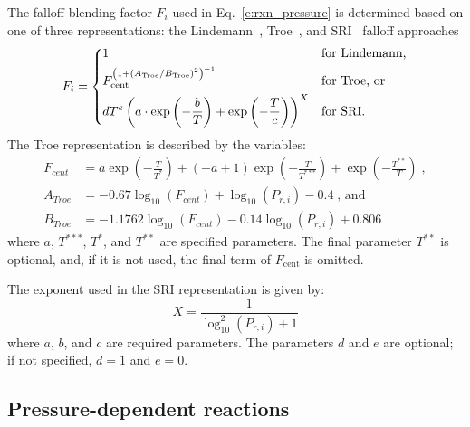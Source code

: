 \documentclass[12pt]{article}
\begin{document}
The falloff blending factor $F_i$ used in Eq.~\cref{e:rxn_pressure} is determined based on one of three representations: the Lindemann~\cite{Lindemann:1922cz}, Troe~\cite{Gilbert:1983bb}, and SRI~\cite{Stewart:1989gj} falloff approaches
\begin{equation}
F_i = \begin{dcases}
1 &\text{for Lindemann,} \\
F_{\text{cent}}^{ \left( 1 + ( A_{\text{Troe}} / B_{\text{Troe}} )^2 \right)^{-1} } &\text{for Troe, or} \\
d T^e \left( a \cdot \exp \left( -\frac{b}{T} \right) + \exp \left( -\frac{T}{c} \right) \right)^X &\text{for SRI.}
\end{dcases}
\end{equation}
The Troe representation is described by the variables:
\begin{align}
 F_{cent} &= a \operatorname{exp}\left({- \frac{T}{T^{*}}}\right) + \left(- a + 1\right) \operatorname{exp}\left({- \frac{T}{T^{***}}}\right) + \operatorname{exp}\left({- \frac{T^{**}}{T}}\right) \;, \\ 
 A_{Troe} &= - 0.67 \log_{10}{\left (F_{cent} \right )} + \log_{10}{\left (P_{r, i} \right )} - 0.4 \;\text{, and}\\
 B_{Troe} &= - 1.1762 \log_{10}{\left (F_{cent} \right )} - 0.14 \log_{10}{\left (P_{r, i} \right )} + 0.806 
\end{align}
where $a$, $T^{***}$, $T^*$, and $T^{**}$ are specified parameters.
The final parameter $T^{**}$ is optional, and, if it is not used, the final term of $F_{\text{cent}}$ is omitted.

The exponent used in the SRI representation is given by:
\begin{equation}
 X = \frac{1}{\log_{10}^{2}{\left (P_{r, i} \right )} + 1}
\end{equation}
where $a$, $b$, and $c$ are required parameters.
The parameters $d$ and $e$ are optional; if not specified, $d = 1$ and $e = 0$.

\subsection{Pressure-dependent reactions}
\end{document}
